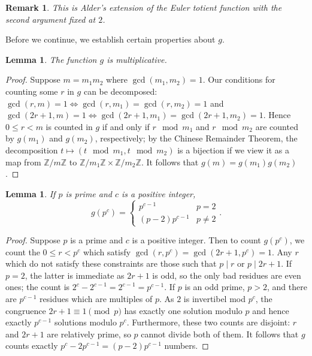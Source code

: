 \documentclass{article}
\theoremstyle{mydefstyle}
\newtheorem*{remark}{Remark}
\newtheorem{lemma}[theorem]{Lemma}
\newcommand{\zz}[0]{\mathbb Z}
\begin{document}
\begin{remark} This is Alder's extension of the Euler totient function\cite{alder1958generalization} with the second argument fixed at $2$. \end{remark}

Before we continue, we establish certain properties about $g$. 

\begin{lemma}
The function $g$ is multiplicative. 
\end{lemma}

\begin{proof}
Suppose $m=m_1m_2$ where $\gcd(m_1,m_2)=1$. Our conditions for counting some $r$ in $g$ can be decomposed: $\gcd(r,m)=1\iff\gcd(r,m_1)=\gcd(r,m_2)=1$ and $\gcd(2r+1,m)=1\iff\gcd(2r+1,m_1)=\gcd(2r+1,m_2)=1$. Hence $0\le r<m$ is counted in $g$ if and only if $r\mod m_1$ and $r\mod m_2$ are counted by $g(m_1)$ and $g(m_2)$, respectively; by the Chinese Remainder Theorem, the decomposition $t\mapsto(t\mod m_1,t\mod m_2)$ is a bijection if we view it as a map from $\zz/m\zz$ to $\zz/m_1\zz\times\zz/m_2\zz$. It follows that $g(m)=g(m_1)g(m_2)$. 
\end{proof}

\begin{lemma}
If $p$ is prime and $c$ is a positive integer, \[g(p^c)=\begin{cases}p^{c-1}&p=2\\(p-2)p^{c-1}&p\neq2\end{cases}.\]
\end{lemma}

\begin{proof}
Suppose $p$ is a prime and $c$ is a positive integer. Then to count $g(p^c)$, we count the $0\le r<p^c$ which satisfy $\gcd(r,p^c)=\gcd(2r+1,p^c)=1$. Any $r$ which do not satisfy these constraints are those such that $p\mid r$ or $p\mid2r+1$. If $p=2$, the latter is immediate as $2r+1$ is odd, so the only bad residues are even ones; the count is $2^c-2^{c-1}=2^{c-1}=p^{c-1}$. If $p$ is an odd prime, $p>2$, and there are $p^{c-1}$ residues which are multiples of $p$. As $2$ is invertibel mod $p^c$, the congruence $2r+1\equiv1\pmod p$ has exactly one solution modulo $p$ and hence exactly $p^{c-1}$ solutions modulo $p^c$. Furthermore, these two counts are disjoint: $r$ and $2r+1$ are relatively prime, so $p$ cannot divide both of them. It follows that $g$ counts exactly $p^c-2p^{c-1}=(p-2)p^{c-1}$ numbers. 
\end{proof}
\end{document}
